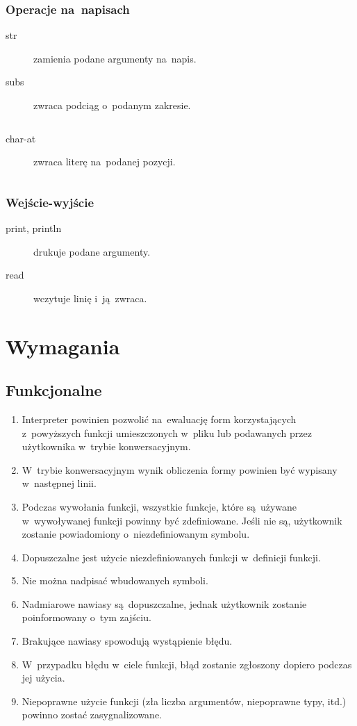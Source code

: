 \documentclass[a4paper,11pt]{article}
\newcommand{\clj}[1]{
\inputminted[fontsize=\footnotesize,frame=single,samepage=true]{clojure}{code/#1.clj}
}
\begin{document}
\subsubsection{Operacje na~napisach}

\begin{description}
\item[str] zamienia podane argumenty na~napis.

\item[subs] zwraca podciąg o~podanym zakresie.
  \clj{subs}

\item[char-at] zwraca literę na~podanej pozycji.
  \clj{char-at}
\end{description}

\subsubsection{Wejście-wyjście}

\begin{description}
\item[print, println] drukuje podane argumenty.
\item[read] wczytuje linię i~ją~zwraca.
\end{description}

\section{Wymagania}

\subsection{Funkcjonalne}

\begin{enumerate}
\item Interpreter powinien pozwolić na~ewaluację form korzystających
  z~powyższych funkcji umieszczonych w~pliku lub podawanych przez użytkownika
  w~trybie konwersacyjnym.
\item W~trybie konwersacyjnym wynik obliczenia formy powinien być wypisany
  w~następnej linii.
\item Podczas wywołania funkcji, wszystkie funkcje, które są~używane
  w~wywoływanej funkcji powinny być zdefiniowane. Jeśli nie są, użytkownik
  zostanie powiadomiony o~niezdefiniowanym symbolu.
\item Dopuszczalne jest użycie niezdefiniowanych funkcji w~definicji funkcji.
\item Nie można nadpisać wbudowanych symboli.
\item Nadmiarowe nawiasy są~dopuszczalne, jednak użytkownik zostanie
  poinformowany o~tym zajściu.
\item Brakujące nawiasy spowodują wystąpienie błędu.
\item W~przypadku błędu w~ciele funkcji, błąd zostanie zgłoszony dopiero
  podczas jej użycia.
\item Niepoprawne użycie funkcji (zła liczba argumentów, niepoprawne typy,
  itd.) powinno zostać zasygnalizowane.
\end{enumerate}
\end{document}
